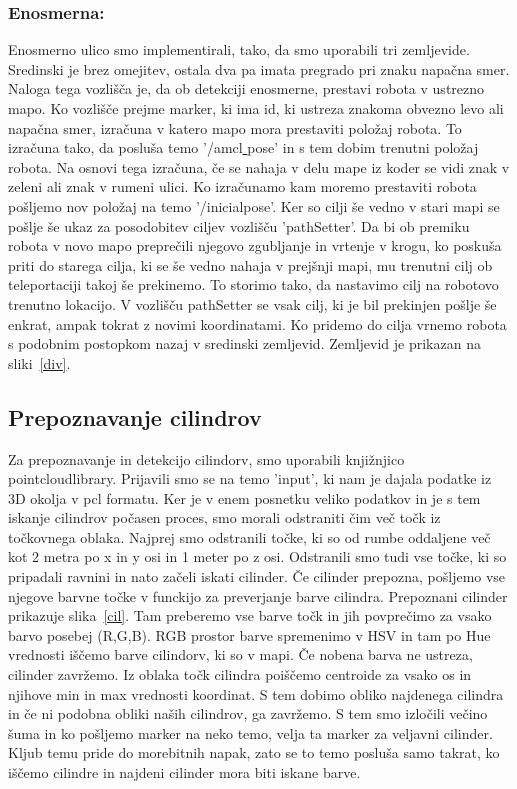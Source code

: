 \documentclass{llncs}
\begin{document}
\subsubsection{Enosmerna:}
Enosmerno ulico smo implementirali, tako, da smo uporabili tri zemljevide. Sredinski je brez omejitev, ostala dva pa imata pregrado pri znaku napačna smer.
Naloga tega vozlišča je, da ob detekciji enosmerne, prestavi robota v ustrezno mapo. Ko vozlišče prejme marker, ki ima id, ki ustreza znakoma obvezno levo ali napačna smer, izračuna v katero mapo mora prestaviti položaj robota. To izračuna tako, da posluša temo '/amcl\underline{ }pose' in s tem dobim trenutni položaj robota. Na osnovi tega izračuna, če se nahaja v delu mape iz koder se vidi znak v zeleni ali znak v rumeni ulici. Ko izračunamo kam moremo prestaviti robota pošljemo nov položaj na temo '/inicialpose'. Ker so cilji še vedno v stari mapi se pošlje še ukaz za posodobitev ciljev vozlišču 'pathSetter'.
Da bi ob premiku robota v novo mapo preprečili njegovo zgubljanje in vrtenje v krogu, ko poskuša priti do starega cilja, ki se še vedno nahaja v prejšnji mapi, mu trenutni cilj ob teleportaciji takoj še prekinemo. To storimo tako, da nastavimo cilj na robotovo trenutno lokacijo. V vozlišču pathSetter se vsak cilj, ki je bil prekinjen pošlje še enkrat, ampak tokrat z novimi koordinatami. Ko pridemo do cilja vrnemo robota s podobnim postopkom nazaj v sredinski zemljevid. Zemljevid je prikazan na sliki~\ref{div}.



\subsection{Prepoznavanje cilindrov}
Za prepoznavanje in detekcijo cilindorv, smo uporabili knjižnjico pointcloudlibrary. Prijavili smo se na temo 'input', ki nam je dajala podatke iz 3D okolja v pcl formatu. Ker je v enem posnetku veliko podatkov in je s tem iskanje cilindrov počasen proces, smo morali odstraniti čim več točk iz točkovnega oblaka. Najprej smo odstranili točke, ki so od rumbe oddaljene več kot 2 metra po  x in y osi in 1 meter po z osi. Odstranili smo tudi vse točke, ki so pripadali ravnini in nato začeli iskati cilinder. Če cilinder prepozna, pošljemo vse njegove barvne točke v funckijo za preverjanje barve cilindra. Prepoznani cilinder prikazuje slika~\ref{cil}. Tam preberemo vse barve točk in jih povprečimo za vsako barvo posebej (R,G,B). RGB prostor barve spremenimo v HSV in tam po Hue vrednosti iščemo barve cilindorv, ki so v mapi. Če nobena barva ne ustreza, cilinder zavržemo. Iz oblaka točk cilindra poiščemo centroide za vsako os in njihove min in max vrednosti koordinat. S tem dobimo obliko najdenega cilindra in če ni podobna obliki naših cilindrov, ga zavržemo. S tem smo izločili večino šuma in ko pošljemo marker na neko temo, velja ta marker za veljavni cilinder. Kljub temu pride do morebitnih napak, zato se to temo posluša samo takrat, ko iščemo cilindre in najdeni cilinder mora biti iskane barve. 
\end{document}
